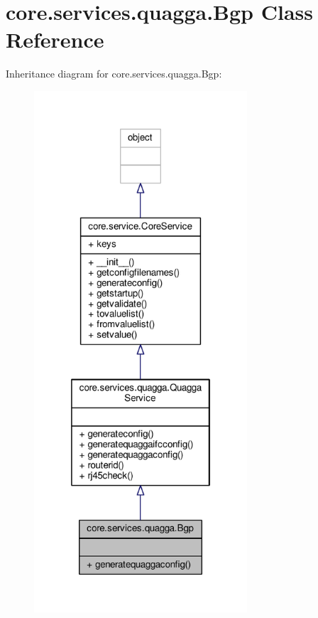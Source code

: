 \hypertarget{classcore_1_1services_1_1quagga_1_1_bgp}{\section{core.\+services.\+quagga.\+Bgp Class Reference}
\label{classcore_1_1services_1_1quagga_1_1_bgp}
}


Inheritance diagram for core.\+services.\+quagga.\+Bgp\+:
\nopagebreak
\begin{figure}[H]
\begin{center}
\leavevmode
\includegraphics[height=550pt]{classcore_1_1services_1_1quagga_1_1_bgp__inherit__graph}
\end{center}
\end{figure}


